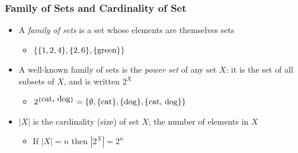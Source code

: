 \documentclass{beamer}
\newtheorem{defn}{Definition}
\numberwithin{equation}{section}
\begin{document}
\begin{frame}
\frametitle{Family of Sets and Cardinality of Set}

\begin{itemize}
\item A \textit{family of sets} is a set whose elements are themselves sets
\begin{itemize}
\item $\{\{1, 2, 4\}, \{2, 6\}, \{\hbox{green}\}\}$ \pause
\end{itemize}
\end{itemize}

\begin{itemize}
\item A well-known family of sets is the \textit{power set} of any set $X$: it is the set of all subsets of $X$, and is written $2^X$ 
\begin{itemize}
\item $2^{\{\hbox{cat, dog}\}}=\{\emptyset, \{\hbox{cat}\}, \{\hbox{dog}\}, \{\hbox{cat, dog}\}\}$ \pause
\end{itemize}
\end{itemize}

\begin{itemize}
\item $|X|$ is the cardinality (size) of set $X$; the number of elements in $X$
\begin{itemize}
\item If $|X|=n$ then $|2^X|=2^n$
\end{itemize}
\end{itemize}

\end{frame}





\end{document}
